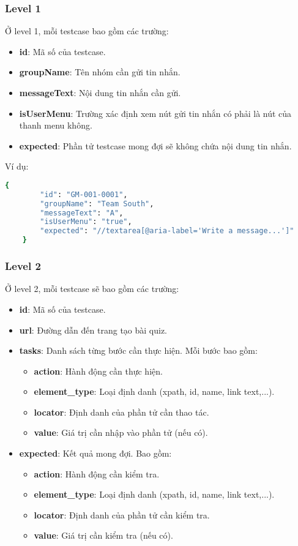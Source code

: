 \subsubsection{Level 1}
Ở level 1, mỗi testcase bao gồm các trường:
\begin{itemize}
    \item \textbf{id}: Mã số của testcase.
    \item \textbf{groupName}: Tên nhóm cần gửi tin nhắn.
    \item \textbf{messageText}: Nội dung tin nhắn cần gửi.
    \item \textbf{isUserMenu}: Trường xác định xem nút gửi tin nhắn có phải là nút của thanh menu không.
    \item \textbf{expected}: Phần tử testcase mong đợi sẽ không chứa nội dung tin nhắn.
\end{itemize}

Ví dụ:
\begin{lstlisting}[language=bash, caption={Ví dụ testcase GM-001-0001 ở level 1}]
    {
        "id": "GM-001-0001",
        "groupName": "Team South",
        "messageText": "A",
        "isUserMenu": "true",
        "expected": "//textarea[@aria-label='Write a message...']"
    }
\end{lstlisting}

\subsubsection{Level 2}

Ở level 2, mỗi testcase sẽ bao gồm các trường:
\begin{itemize}
    \item \textbf{id}: Mã số của testcase.
    \item \textbf{url}: Đường dẫn đến trang tạo bài quiz.
    \item \textbf{tasks}: Danh sách từng bước cần thực hiện. Mỗi bước bao gồm:
\begin{itemize}
    \item \textbf{action}: Hành động cần thực hiện.
    \item \textbf{element\_type}: Loại định danh (xpath, id, name, link text,...).
    \item \textbf{locator}: Định danh của phần tử cần thao tác.
    \item \textbf{value}: Giá trị cần nhập vào phần tử (nếu có).
\end{itemize}
    \item \textbf{expected}: Kết quả mong đợi. Bao gồm:
\begin{itemize}
    \item \textbf{action}: Hành động cần kiểm tra.
    \item \textbf{element\_type}: Loại định danh (xpath, id, name, link text,...).
    \item \textbf{locator}: Định danh của phần tử cần kiểm tra.
    \item \textbf{value}: Giá trị cần kiểm tra (nếu có).
\end{itemize}
\end{itemize}

